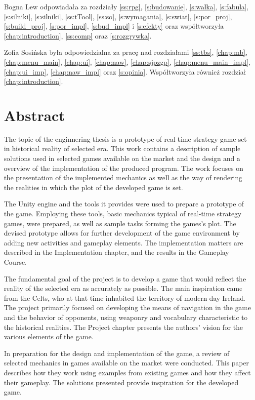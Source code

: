 Bogna Lew odpowiadała za rozdziały \ref{ss:rpg}, \ref{s:budowanie}, \ref{s:walka}, \ref{s:fabula}, \ref{s:silniki},
\ref{s:silniki}, \ref{ss:tTool}, \ref{ss:so}, \ref{s:wymagania}, \ref{s:swiat}, \ref{s:por_proj}, \ref{s:build_proj},
\ref{s:por_impl}, \ref{s:bud_impl} i \ref{s:efekty} oraz współtworzyła \ref{chap:introduction}, \ref{ss:comp} oraz \ref{s:rozgrywka}.

Zofia Sosińska była odpowiedzialna za
pracę nad rozdziałami \ref{ss:tbs}, \ref{chap:mb}, \ref{chap:menu_main}, \ref{chap:ui}, \ref{chap:naw}, \ref{chap:sjpzgp},
\ref{chap:menu_main_impl}, \ref{chap:ui_imp}, \ref{chap:naw_impl} oraz \ref{s:opinia}. Współtworzyła również rozdział
\ref{chap:introduction}.

\chapter*{Abstract}
The topic of the enginnering thesis is a prototype of real-time strategy game set in historical reality of selected era.
This work contains a description of sample solutions used in selected games available on the market
and the design and a overview of the implementation of the produced program. The work focuses on the presentation 
of the implemented mechanics as well as
the way of rendering the realities in which the plot of the developed game is set.

The Unity engine and the tools it provides were used to prepare a prototype of the game.
Employing these tools, basic mechanics typical of real-time strategy games, were prepared,
as well as sample tasks forming the games's plot. The devised prototype allows for 
further development of the game environment by adding new activities and gameplay elements.
The implementation matters are described in the Implementation chapter, and the results in the Gameplay Course.

The fundamental goal of the project is to develop a game that would reflect the reality of the selected era as accurately as possible.
The main inspiration came from the Celts, who at that time inhabited the territory of modern day Ireland. 
The project primarily focused on
developing the means of navigation in the game and the behavior of opponents, using weaponry and vocabulary characteristic to the
historical realities. The Project chapter presents the authors' vision for the various elements of the game.

In preparation for the design and implementation of the game, a review of selected mechanics in games available
on the market were conducted. This paper describes how they work using examples from existing games and how
they affect their gameplay. The solutions presented provide inspiration for the developed game.

